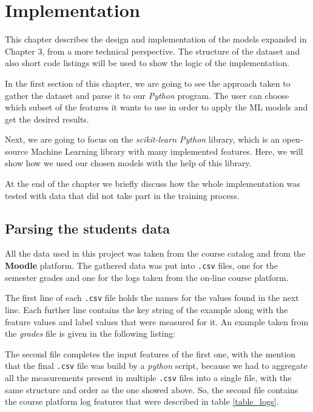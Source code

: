 \chapter{Implementation}

This chapter describes the design and implementation of the models expanded in 
Chapter 3, from a more technical perspective. The structure of the dataset and 
also short code listings will be used to show the logic of the implementation. 

In the first section of this chapter, 
we are going to see the approach taken to gather the dataset and parse it to our 
{\it Python} program. The user can choose which subset of the features it wants 
to use in order to apply the ML models and get the desired results.

Next, we are going to focus on the {\it scikit-learn Python} library, which is 
an open-source Machine Learning library with many implemented features. Here, 
we will show how we used our chosen models with the help of this library.  

At the end of the chapter we briefly discuss how the whole implementation was 
tested with data that did not take part in the training process.

\section{Parsing the students data}

All the data used in this project was taken from the course catalog and from 
the {\bf Moodle} platform. The gathered data was put into \texttt{.csv} files, 
one for the semester grades and one for the logs taken from the on-line course 
platform. 

The first line of each \texttt{.csv} file holds the names for the values found in 
the next line. Each further line contains the key string of the example along 
with the feature values and label values that were measured for it. An example 
taken from the {\it grades} file is given in the following listing: 



The second file completes the input features of the first one, with the mention that the 
final \texttt{.csv} file was build by a {\it python} script, because we had to 
aggregate all the measurements present in multiple \texttt{.csv} files into 
a single file, with the same structure and order as the one showed above. So, the 
second file contains the course platform log features that were described in table 
\ref{table_logs}.

